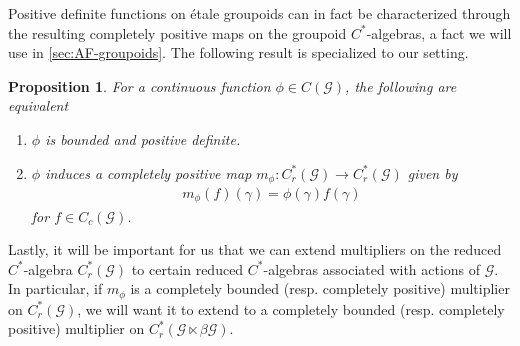 \documentclass[11pt,a4paper,oneside,final,reqno]{amsart}
\newtheorem{proposition}[lemma]{Proposition}
\theoremstyle{definition}
\newcommand{\G}{\mathcal{G}}
\newcommand{\Cred}{C_{r}^{*}}
\numberwithin{equation}{section}
\begin{document}
	Positive definite functions on \'etale groupoids can in fact be characterized through the resulting completely positive maps on the groupoid $C^*$-algebras, a fact we will use in \cref{sec:AF-groupoids}. 
	The following result is \cite[Theorem 8.5]{BussKwasniewskiMcKeeSkalski2024} specialized to our setting.
	
	\begin{proposition}\label{prop:pos-def-iff-cp-map}
		For a continuous function $\phi \in C(\G)$, the following are equivalent
		\begin{enumerate}
			\item $\phi$ is bounded and positive definite.
			\item $\phi$ induces a completely positive map $m_\phi \colon \Cred (\G) \to \Cred(\G)$ given by
			\begin{align*}
				m_\phi (f) (\gamma) = \phi(\gamma) f(\gamma)
			\end{align*}
			for $f \in C_c (\G)$. 
		\end{enumerate}
	\end{proposition}
	
	Lastly, it will be important for us that we can extend multipliers on the reduced $C^*$-algebra $\Cred (\G)$ to certain reduced $C^*$-algebras associated with actions of $\G$. In particular, if $m_\phi$ is a completely bounded  (resp. completely positive) multiplier on $\Cred (\G)$, we will want it to extend to a completely bounded (resp. completely positive) multiplier on  
	$\Cred ( \G \ltimes \beta\G)$.
\end{document}
